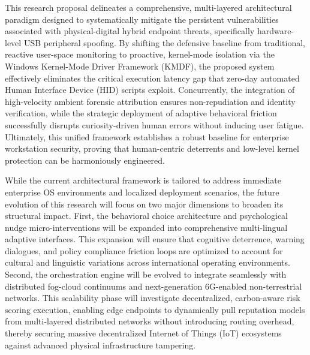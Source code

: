 \documentclass{ieeeaccess}
\begin{document}
This research proposal delineates a comprehensive, multi-layered architectural paradigm designed to systematically mitigate the persistent vulnerabilities associated with physical-digital hybrid endpoint threats, specifically hardware-level USB peripheral spoofing. By shifting the defensive baseline from traditional, reactive user-space monitoring to proactive, kernel-mode isolation via the Windows Kernel-Mode Driver Framework (KMDF), the proposed system effectively eliminates the critical execution latency gap that zero-day automated Human Interface Device (HID) scripts exploit. Concurrently, the integration of high-velocity ambient forensic attribution ensures non-repudiation and identity verification, while the strategic deployment of adaptive behavioral friction successfully disrupts curiosity-driven human errors without inducing user fatigue. Ultimately, this unified framework establishes a robust baseline for enterprise workstation security, proving that human-centric deterrents and low-level kernel protection can be harmoniously engineered.

While the current architectural framework is tailored to address immediate enterprise OS environments and localized deployment scenarios, the future evolution of this research will focus on two major dimensions to broaden its structural impact. First, the behavioral choice architecture and psychological nudge micro-interventions will be expanded into comprehensive multi-lingual adaptive interfaces. This expansion will ensure that cognitive deterrence, warning dialogues, and policy compliance friction loops are optimized to account for cultural and linguistic variations across international operating environments. Second, the orchestration engine will be evolved to integrate seamlessly with distributed fog-cloud continuums and next-generation 6G-enabled non-terrestrial networks. This scalability phase will investigate decentralized, carbon-aware risk scoring execution, enabling edge endpoints to dynamically pull reputation models from multi-layered distributed networks without introducing routing overhead, thereby securing massive decentralized Internet of Things (IoT) ecosystems against advanced physical infrastructure tampering.








\end{document}
